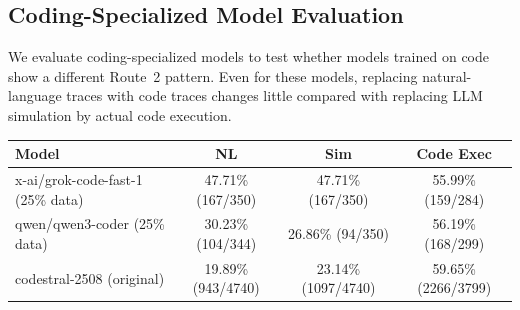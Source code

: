 \subsection{Coding-Specialized Model Evaluation}
\label{app:coding_specialized_model_evaluation}

We evaluate coding-specialized models to test whether models trained on code
show a different Route~2 pattern. Even for these models, replacing
natural-language traces with code traces changes little compared with replacing
LLM simulation by actual code execution.

\begin{center}
\footnotesize
\begin{tabular*}{0.92\textwidth}{@{\extracolsep{\fill}}lccc@{}}
\toprule
Model & NL & Sim & Code Exec \\
\midrule
x-ai/grok-code-fast-1 (25\% data) & 47.71\% (167/350) & 47.71\% (167/350) & 55.99\% (159/284) \\
qwen/qwen3-coder (25\% data) & 30.23\% (104/344) & 26.86\% (94/350) & 56.19\% (168/299) \\
codestral-2508 (original) & 19.89\% (943/4740) & 23.14\% (1097/4740) & 59.65\% (2266/3799) \\
\bottomrule
\end{tabular*}
\label{tab:appendix_coding_models}
\end{center}

